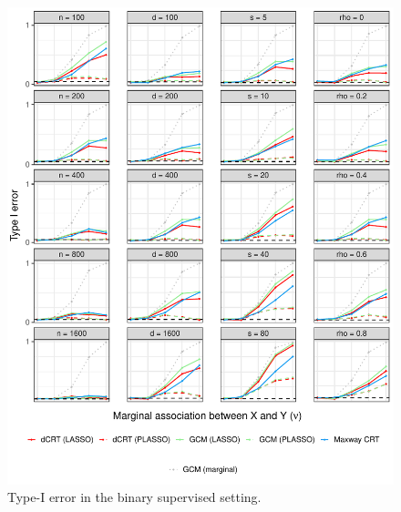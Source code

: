 \documentclass[12pt]{article}
\theoremstyle{definition}
\theoremstyle{remark}
\begin{document}
\begin{figure}[!ht]
	\centering
	\includegraphics[scale = 1]{figures/binomial_supervised_setting_null.pdf}
	\caption{Type-I error in the binary supervised setting.}
	\label{fig:binomial_supervised_null}
\end{figure}
\end{document}
